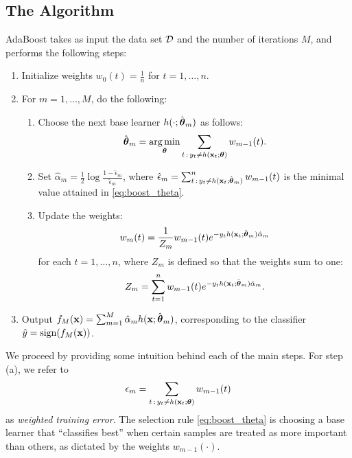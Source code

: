 \documentclass[english]{article}
\begin{document}
\subsection{The Algorithm}

AdaBoost takes as input the data set $\mathcal{D}$ and the number of iterations $M$, and performs the following steps:
\begin{enumerate}
    \item Initialize weights $w_0(t) = \frac{1}{n}$ for $t=1,\dotsc,n$.
    \item For $m=1,\dotsc,M$, do the following:
    \begin{enumerate}
        \item Choose the next base learner $h(\cdot;\hat{\boldsymbol{\theta}}_m)$ as follows:
        \begin{equation}
            \hat{\boldsymbol{\theta}}_m = \operatorname*{arg\,min}_{\boldsymbol{\theta}}  \sum_{t \,:\, y_t \ne h(\mathbf{x}_t;\boldsymbol{\theta})} w_{m-1}(t). \label{eq:boost_theta}
        \end{equation}
        \item Set $\hat{\alpha}_m = \frac{1}{2} \log \frac{1 - \hat{\epsilon}_m}{\hat{\epsilon}_m}$, where $\hat{\epsilon}_m = \sum_{t \,:\, y_t \ne h(\mathbf{x}_t;\hat{\boldsymbol{\theta}}_m)}^n w_{m-1}(t)$ is the minimal value attained in \eqref{eq:boost_theta}.
        \item Update the weights:
        \begin{equation}
            w_m(t) = \frac{1}{Z_m} w_{m-1}(t) e^{-y_t h(\mathbf{x}_t;\hat{\boldsymbol{\theta}}_m) \hat{\alpha}_m } \label{eq:boost_w}
        \end{equation}
        for each $t=1,\dotsc,n$, where $Z_m$ is defined so that the weights sum to one:
        \begin{equation}
            Z_m = \sum_{t=1}^n w_{m-1}(t) e^{-y_t h(\mathbf{x}_t;\hat{\boldsymbol{\theta}}_m) \hat{\alpha}_m }.  \label{eq:Zm}
        \end{equation}
    \end{enumerate}
    \item Output $f_M(\mathbf{x}) = \sum_{m=1}^M \hat{\alpha}_m h(\mathbf{x}; \hat{\boldsymbol{\theta}}_m)$, corresponding to the classifier $\hat{y}= \mathrm{sign}(f_M(\mathbf{x}))$.
\end{enumerate}

We proceed by providing some intuition behind each of the main steps.  For step (a), we refer to
\begin{equation}
    \epsilon_m = \sum_{t \,:\, y_t \ne h(\mathbf{x}_t;\boldsymbol{\theta})} w_{m-1}(t)
\end{equation}
as {\em weighted training error}. The selection rule \eqref{eq:boost_theta} is choosing a base learner that ``classifies best'' when certain samples are treated as more important than others, as dictated by the weights $w_{m-1}(\cdot)$.
\end{document}
